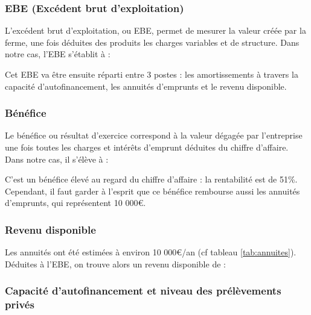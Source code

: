 \documentclass{book}
\begin{document}
\subsubsection{EBE (Excédent brut d'exploitation)}

L'excédent brut d'exploitation, ou EBE, permet de mesurer la valeur créée par la ferme, une fois déduites des produits les charges variables et de structure. Dans notre cas, l'EBE s'établit à :


\noindent{}

Cet EBE va être ensuite réparti entre 3 postes : les amortissements à travers la capacité d'autofinancement, les annuités d'emprunts et le revenu disponible.

\subsubsection{Bénéfice}

Le bénéfice ou résultat d'exercice correspond à la valeur dégagée par l'entreprise une fois toutes les charges et intérêts d'emprunt déduites du chiffre d'affaire. Dans notre cas, il s'élève à :

\noindent{}

C'est un bénéfice élevé au regard du chiffre d'affaire : la rentabilité est de 51\%. Cependant, il faut garder à l'esprit que ce bénéfice rembourse aussi les annuités d'emprunts, qui représentent 10 000\euro{}.

\subsubsection{Revenu disponible}

Les annuités ont été estimées à environ 10 000\euro{}/an (cf tableau  \ref{tab:annuites}). Déduites à l'EBE, on trouve alors un revenu disponible de :

\noindent{}

\subsubsection{Capacité d'autofinancement et niveau des prélèvements privés}
\end{document}
